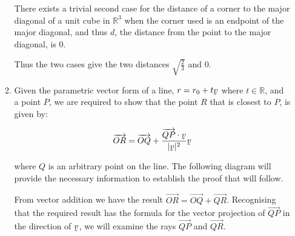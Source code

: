 \documentclass[a4paper]{article}
\begin{document}
\begin{enumerate}[label=\textbf{\arabic*.}]
\begin{enumerate}
		There exists a trivial second case for the distance of a corner to the major diagonal of a unit cube in $\mathbb{R}^3$ when the corner used is an endpoint of the major diagonal, and thus $d$, the distance from the point to the major diagonal, is 0.

		Thus the two cases give the two distances $\sqrt{\frac{2}{3}}$ and $0$.

		\item Given the parametric vector form of a line, $r = r_0 + t\underaccent{\tilde}{v}$ where $t\in\mathbb{R}$, and a point $P$, we are required to show that the point $R$ that is closest to $P$, is given by:

		\begin{align*}
		\overrightarrow{OR} & = \overrightarrow{OQ} + \frac{\overrightarrow{QP}\cdot{\underaccent{\tilde}{v}}}{|\underaccent{\tilde}{v}|^2}\underaccent{\tilde}{v}\\
		\end{align*}

		where $Q$ is an arbitrary point on the line.
		\bigbreak
		The following diagram will provide the necessary information to establish the proof that will follow.

		\begin{center}



		\end{center}

		From vector addition we have the result $\overrightarrow{OR} = \overrightarrow{OQ} + \overrightarrow{QR}$. Recognising that the required result has the formula for the vector projection of $\overrightarrow{QP}$ in the direction of $\underaccent{\tilde}{v}$, we will examine the rays $\overrightarrow{QP}$ and $\overrightarrow{QR}$.


\end{enumerate}
\end{enumerate}
\end{document}
